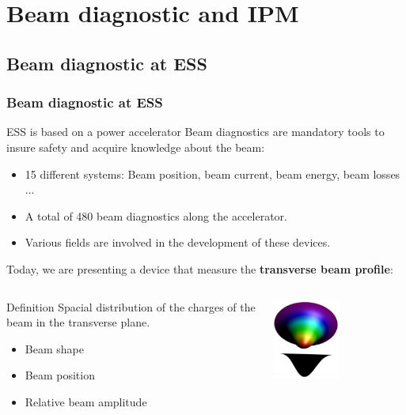 \section{Beam diagnostic and IPM}
\subsection{Beam diagnostic at ESS}
\begin{frame}
  \frametitle{Beam diagnostic at ESS}
  \begin{block}{ESS is based on a power accelerator}
    Beam diagnostics are mandatory tools to insure safety and acquire knowledge about the beam:
    \begin{itemize}
      \item 15 different systems: Beam position, beam current, beam energy, beam losses ...
      \item A total of 480 beam diagnostics along the accelerator.
      \item Various fields are involved in the development of these devices.
    \end{itemize}
  \end{block}

  Today, we are presenting a device that measure the \textbf{transverse beam profile}:
  \begin{columns}
    \begin{column}{0.60\textwidth}
      \begin{block}{Definition}
        Spacial distribution of the charges of the beam in the transverse plane.
        \begin{itemize}
          \item Beam shape
          \item Beam position
          \item Relative beam amplitude
        \end{itemize}
      \end{block}
    \end{column}
    \begin{column}{0.30\textwidth}
      \centering
      \includegraphics[width=0.5\textwidth]{02_ESS/fig/fig000_profile2}
    \end{column}
  \end{columns}
\end{frame}

